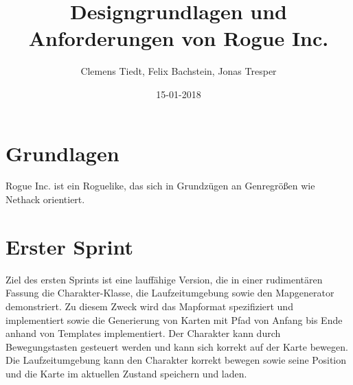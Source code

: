 \documentclass{article}
\title{Designgrundlagen und Anforderungen von Rogue Inc.}
\author{Clemens Tiedt, Felix Bachstein, Jonas Tresper}
\date{15-01-2018}
\begin{document}
\maketitle

\section{Grundlagen}
Rogue Inc. ist ein Roguelike, das sich in Grundzügen an Genregrößen wie Nethack orientiert. 

\section{Erster Sprint}
Ziel des ersten Sprints ist eine lauffähige Version, die in einer rudimentären Fassung die Charakter-Klasse, die Laufzeitumgebung sowie den Mapgenerator demonstriert.
Zu diesem Zweck wird das Mapformat spezifiziert und implementiert sowie die Generierung von Karten mit Pfad von Anfang bis Ende anhand von Templates implementiert.
Der Charakter kann durch Bewegungstasten gesteuert werden und kann sich korrekt auf der Karte bewegen. 
Die Laufzeitumgebung kann den Charakter korrekt bewegen sowie seine Position und die Karte im aktuellen Zustand speichern und laden.
\end{document}
